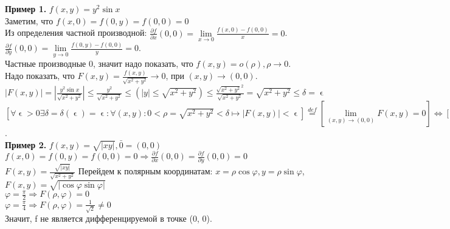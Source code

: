 \documentclass[a4paper,14pt]{article} %
\begin{document}
	 \textbf{Пример 1.} $f(x, y) = y^2 \sin x$\\
	 Заметим, что $f(x, 0) = f(0, y) = f(0, 0) = 0$\\
	 Из определения частной производной: $\frac{\partial f}{\partial x}(0,0) = \lim\limits_{x\to0} \frac {f(x, 0) - f(0, 0)} {x} = 0$.\\
	  $\frac{\partial f}{\partial y}(0,0) = \lim\limits_{y\to0} \frac {f(0, y) - f(0, 0)} {y} = 0$.\\
	 Частные производные 0, значит надо показать, что $f(x, y) = o(\rho), \rho \to 0$.
	 Надо показать, что $F(x, y) = \frac{f(x, y)}{\sqrt{x^2 + y^2}} \to 0$, при $(x, y) \to (0, 0)$.\\
	 $|F(x, y)| = |\frac{y^2 \sin x}{\sqrt{x^2 + y^2}}| \leq \frac{y^2}{\sqrt{x^2 + y^2}} \leq (|y| \leq \sqrt{x^2 + y^2}) \leq \frac{\sqrt{x^2 + y^2}^2}{\sqrt{x^2 + y^2}} = \sqrt{x^2 + y^2} \leq \delta = \upvarepsilon$\\
	 $[\forall\upvarepsilon > 0  \exists\delta = \delta(\upvarepsilon) = \upvarepsilon: \forall(x, y): 0 < \rho = \sqrt{x^2 + y^2} < \delta \mapsto |F(x, y)| < \upvarepsilon] \stackrel{def}{=} [\lim\limits_{(x, y) \to (0, 0)} F(x, y) = 0] \Leftrightarrow [f(x, y) = o(\rho), \rho \to 0]$.\\
	 
	 \textbf{Пример 2.} $f(x, y) = \sqrt{|xy|}, \bar0 = (0, 0)$\\
	 $f(x, 0) = f(0, y) = f(0, 0) = 0 \Rightarrow \frac{\partial f}{\partial x}(0, 0) = \frac{\partial f}{\partial y}(0, 0) = 0$\\
	 $F(x, y) = \frac{\sqrt{|xy|}}{\sqrt{x^2 + y^2}}$ Перейдем к полярным координатам: $x = \rho \cos \varphi, y = \rho \sin \varphi$, $F(x, y) = \sqrt{|\cos \varphi\sin \varphi|}$\\
	 $\varphi = \frac{\pi}{2} \Rightarrow F(\rho, \varphi) = 0$\\
	 $\varphi = \frac{\pi}{4} \Rightarrow F(\rho, \varphi) = \frac{1}{\sqrt{2}} \not= 0$\\
	 Значит, f не является дифференцируемой в точке (0, 0).\\
	
\end{document}
